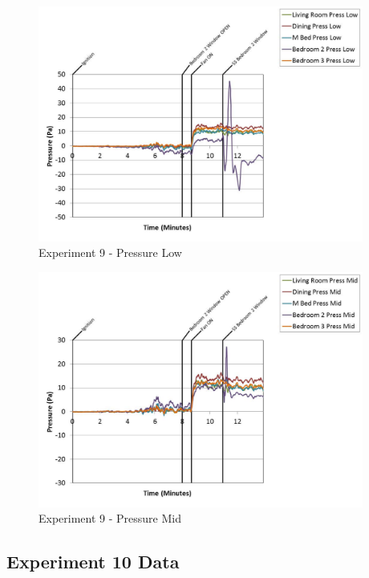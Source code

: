 \documentclass{article}
\begin{document}
\begin{appendices}
	\clearpage

	\begin{figure}[h!]
		\centering
		\includegraphics[height=3.05in]{0_Images/Results_Charts/Exp_9_Charts/PressureLow.pdf}
		\caption{Experiment 9 - Pressure Low}
	\end{figure}
 

	\begin{figure}[h!]
		\centering
		\includegraphics[height=3.05in]{0_Images/Results_Charts/Exp_9_Charts/PressureMid.pdf}
		\caption{Experiment 9 - Pressure Mid}
	\end{figure}
 
	\clearpage

		\clearpage
\clearpage		\large
\subsection{Experiment 10 Data} \label{App:Exp10Results} 


\end{appendices}
\end{document}
